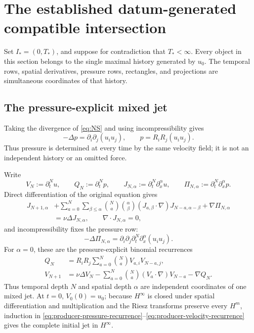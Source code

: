 \section{The established datum-generated compatible intersection}
\label{sec:producer}

Set \(I_*=(0,T_*)\), and suppose for contradiction that \(T_*<\infty\).
Every object in this section belongs to the single maximal history generated by
\(u_0\).  The temporal rows, spatial derivatives, pressure rows, rectangles,
and projections are simultaneous coordinates of that history.

\subsection{The pressure-explicit mixed jet}

Taking the divergence of \eqref{eq:NS} and using incompressibility gives
\begin{equation}
 -\Delta p=\partial_i\partial_j(u_i u_j),
 \qquad
 p=R_iR_j(u_i u_j).
 \label{eq:producer-pressure-base}
\end{equation}
Thus pressure is determined at every time by the same velocity field; it is
not an independent history or an omitted force.

Write
\[
 V_N:=\partial_t^Nu,
 \qquad Q_N:=\partial_t^Np,
 \qquad
 J_{N,\alpha}:=\partial_t^N\partial_x^\alpha u,
 \qquad
 \Pi_{N,\alpha}:=\partial_t^N\partial_x^\alpha p.
\]
Direct differentiation of the original equation gives
\begin{equation}
\begin{aligned}
 J_{N+1,\alpha}
 &+
 \sum_{a=0}^{N}\sum_{\beta\leq\alpha}
 \binom Na\binom\alpha\beta
 (J_{a,\beta}\cdot\nabla)J_{N-a,\alpha-\beta}
 +\nabla\Pi_{N,\alpha}
 \\
 &=\nu\Delta J_{N,\alpha},
 \qquad \nabla\cdot J_{N,\alpha}=0,
\end{aligned}
\label{eq:producer-mixed-jet}
\end{equation}
and incompressibility fixes the pressure row:
\begin{equation}
 -\Delta\Pi_{N,\alpha}
 =\partial_i\partial_j\partial_t^N\partial_x^\alpha(u_i u_j).
 \label{eq:producer-pressure-row}
\end{equation}
For \(\alpha=0\), these are the pressure-explicit binomial recurrences
\begin{align}
 Q_N
 &=R_iR_j\sum_{a=0}^{N}\binom NaV_{a,i}V_{N-a,j},
 \label{eq:producer-pressure-recurrence}\\
 V_{N+1}
 &=\nu\Delta V_N
 -\sum_{a=0}^{N}\binom Na(V_a\cdot\nabla)V_{N-a}
 -\nabla Q_N.
 \label{eq:producer-velocity-recurrence}
\end{align}
Thus temporal depth \(N\) and spatial depth \(\alpha\) are independent
coordinates of one mixed jet.  At \(t=0\), \(V_0(0)=u_0\); because
\(H^\infty\) is closed under spatial differentiation and multiplication and
the Riesz transforms preserve every \(H^m\), induction in
\eqref{eq:producer-pressure-recurrence}--\eqref{eq:producer-velocity-recurrence}
gives the complete initial jet in \(H^\infty\).

